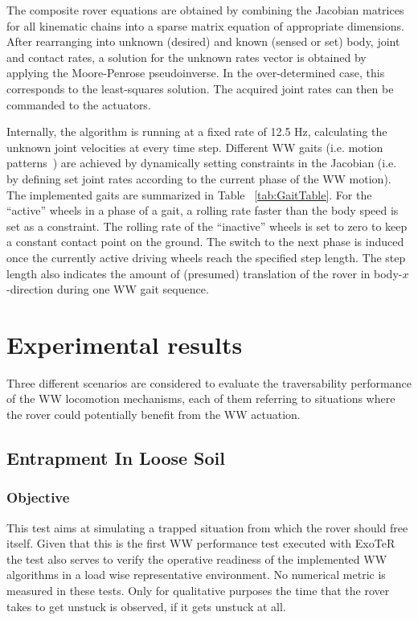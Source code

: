 \documentclass[a4paper,twocolumn]{esapub2005} %
\begin{document}
The composite rover equations are obtained by combining the Jacobian
matrices for all kinematic chains into a sparse matrix equation of appropriate
dimensions. After rearranging into unknown (desired) and known (sensed or set) 
body, joint and contact rates, a solution for the unknown rates vector is 
obtained by applying the Moore-Penrose pseudoinverse. In the over-determined 
case, this corresponds to the least-squares solution. The acquired joint rates 
can then be commanded to the actuators.

Internally, the algorithm is running at a fixed rate of 12.5 Hz, calculating 
the unknown joint velocities at every time step. Different WW gaits (i.e. 
motion patterns~\cite{LucWalkingGaits}) are achieved by dynamically setting 
constraints in the Jacobian (i.e. by defining set joint rates according to the 
current phase of the WW motion). The implemented gaits are summarized in Table 
~\ref{tab:GaitTable}. For the ``active'' wheels in a phase of a gait, a rolling 
rate faster than the body speed is set as a constraint. The rolling rate of the 
``inactive'' wheels is set to zero to keep a constant contact point on the 
ground. The switch to the next phase is induced once the currently active 
driving wheels reach the specified step length. The step length also indicates 
the amount of (presumed) translation of the rover in body-$x$-direction during 
one WW gait sequence.


\section{Experimental results}

Three different scenarios are considered to evaluate the traversability
performance of the WW locomotion mechanisms, each of them referring
to situations where the rover could potentially benefit from the WW
actuation.

\subsection{Entrapment In Loose Soil} 

\subsubsection{Objective} This test aims at simulating a trapped situation from
which the rover should free itself. Given that this is the first WW performance test
executed with ExoTeR the test also serves to verify the operative
readiness of the implemented WW algorithms in a load wise representative
environment.  No numerical metric is measured in these tests. Only for
qualitative purposes the time that the rover takes to get unstuck is
observed, if it gets unstuck at all.
\end{document}
